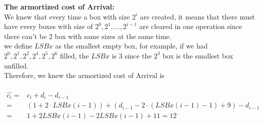 \documentclass{homework}
\begin{document}
\begin{itemize}
    \textbf{The armortized cost of Arrival:}\\
    We knew that every time a box with size $2^i$ are created, it means that there must have every boxes with size of $2^0, 2^1, \ldots, 2^{i-1}$ are cleared in one operation since there can't be 2 box with same sizes at the same time.\\
    we define $LSBx$ as the smallest empty box, for example, if we had $2^0, 2^1,2^2, 2^4,2^5, 2^6$ filled, the $LSBx$ is 3 since the $2^3$ box is the smallest box unfilled.\\
    Therefore, we knew the armortized cost of Arrival is\\\\
    \begin{align*}
        \hat{c_i} =& c_i + d_i - d_{i-1}\\
                  =& (1 + 2 \cdot LSBx(i-1)) + (d_{i-1} - 2 \cdot (LSBx(i-1)-1) + 9 ) - d_{i-1}\\
                  =& 1 + 2 LSBx(i-1) - 2 LSBx(i-1) + 11 = 12
    \end{align*}


\end{itemize}
\end{document}
